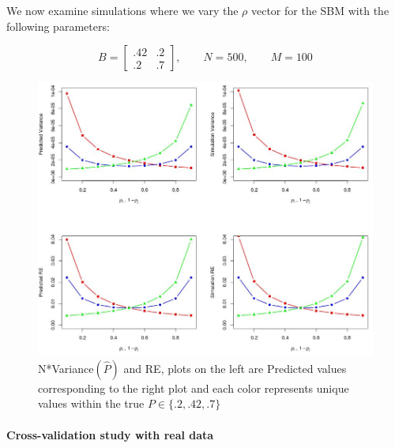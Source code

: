 \documentclass[10pt]{article}
\begin{document}
	We now examine simulations where we vary the $\rho$ vector for the SBM with the following parameters:
	
		\begin{equation*}
		B = \begin{bmatrix}
		.42 & .2 \\
		.2 & .7 
		\end{bmatrix}
		,\qquad N = 500,\qquad M = 100
		\end{equation*}
	
	\begin{figure}[!htb]
		\centering
		\includegraphics[width=16cm]{PI.JPG}
		\caption{N*Variance$(\hat{P})$ and RE, plots on the left are Predicted values corresponding to the right plot and each color represents unique values within the true $P \in \{.2,.42,.7\}$ }
		\label{fig:plot1}
	\end{figure}
	
	\paragraph{Cross-validation study with real data}
\end{document}
